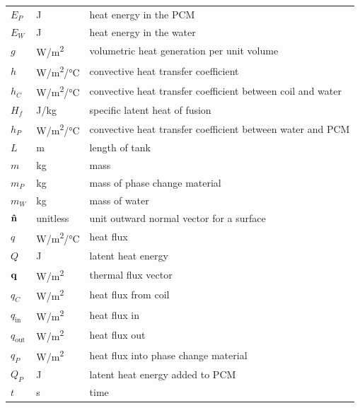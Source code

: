 \documentclass[12pt]{article}
\begin{document}
\begin{longtable*}{l l p{12cm}}
  $E_P$ & \si[per-mode=symbol] {\joule} & heat energy in the PCM
  \\ 
  $E_W$ & \si[per-mode=symbol] {\joule} & heat energy in the water
  \\ 
  $g$ & \si[per-mode=symbol] {\watt\per\square\metre} & volumetric heat
  generation per unit volume
  \\
  $h$ & \si[per-mode=symbol] {\watt\per\square\metre\per\celsius} & convective 
  heat transfer coefficient
  \\ 
  $h_C$ & \si[per-mode=symbol] {\watt\per\square\metre\per\celsius} &
  convective heat transfer coefficient between coil and water
  \\
  $H_f$ & \si[per-mode=symbol] {\joule \per \kilogram} & specific latent heat of
  fusion
  \\
  $h_P$ & \si[per-mode=symbol] {\watt\per\square\metre\per\celsius} &
  convective heat transfer coefficient between water and PCM
  \\
  $L$ & \si{\metre} & length of tank
  \\
  $m$ & \si[per-mode=symbol] {\kilo\gram} & mass
  \\
  $m_P$ & \si[per-mode=symbol] {\kilo\gram} & mass of phase change material
  \\
  $m_W$ & \si[per-mode=symbol] {\kilo\gram} & mass of water
  \\
  $\bf{\hat{n}}$ & \si[per-mode=symbol] {unitless} & unit outward normal 
  vector for a surface 
  \\ 
  $q$ & \si[per-mode=symbol] {\watt \per \square \metre \per \celsius} & heat
  flux
  \\
  $Q$ & \si[per-mode=symbol] {\joule} & latent heat energy
  \\
  $\bf{q}$ & \si[per-mode=symbol] {\watt\per\square\metre} & thermal flux vector
  \\
  $q_C$ & \si[per-mode=symbol] {\watt\per\square\metre} & heat flux from coil
  \\
  $q_\text{in}$ & \si[per-mode=symbol] {\watt\per\square\metre} & heat flux in
  \\ 
  $q_\text{out}$ & \si[per-mode=symbol] {\watt\per\square\metre} & heat flux out
  \\
  $q_P$ & \si[per-mode=symbol] {\watt\per\square\metre} & heat flux into phase
  change material
  \\
  $Q_P$ & \si[per-mode=symbol] {\joule} & latent heat energy added to PCM
  \\
  $t$ & \si[per-mode=symbol] {\second} & time
  \\

\end{longtable*}
\end{document}
